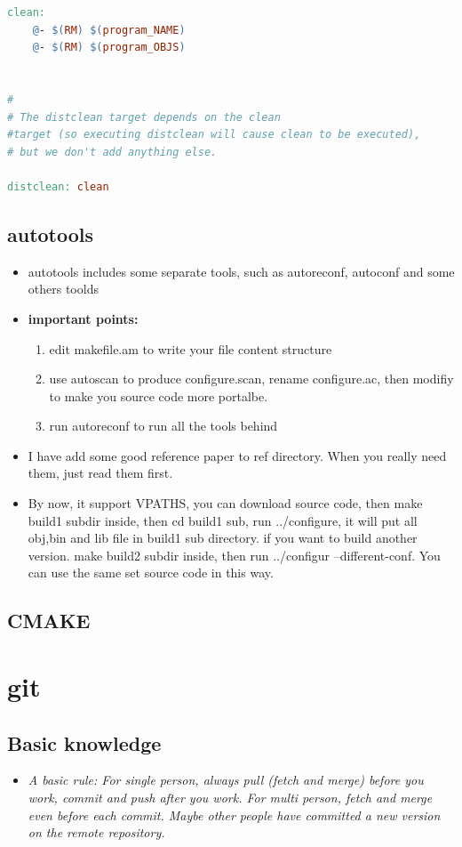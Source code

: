 \documentclass[a4paper,12pt,twoside]{book}
\begin{document}
\begin{itemize}
\begin{itemize}
\begin{lstlisting}[frame=single,  basicstyle=\small, language=make]
clean:
    @- $(RM) $(program_NAME)
    @- $(RM) $(program_OBJS)


#
# The distclean target depends on the clean
#target (so executing distclean will cause clean to be executed), 
# but we don't add anything else.

distclean: clean
\end{lstlisting}


\end{itemize}
\subsection{autotools}
\begin{itemize}
		\item autotools includes some separate tools, such as autoreconf, autoconf and some others toolds
		\item \textbf{ \Three important points:}
				\begin{enumerate}
						\item edit makefile.am to write your file content structure
						\item use autoscan to produce configure.scan, rename configure.ac, then modifiy to make you source code more portalbe. 
						\item run autoreconf to run all the tools behind
				\end{enumerate}
		\item I have add some good reference paper to ref directory. When you really need them, just read them first. 
		\item By now, it support VPATHS, you can download source code, then make build1 subdir inside, then cd build1 sub, run ../configure, it will put all obj,bin and lib file in build1 sub directory. if you want to build another version. make build2 subdir inside, then run ../configur --different-conf. You can use the same set source code in this way. 
\end{itemize}
\subsection{CMAKE}


\section{git}

\subsection{Basic knowledge}
\begin{itemize}
\item \emph{A basic rule:  For single person, always pull (fetch and merge) before you work,  commit and push after you work.  For multi person, fetch and merge even before each commit.  Maybe other people have committed a new version on the remote repository. }


\end{itemize}
\end{itemize}
\end{document}
